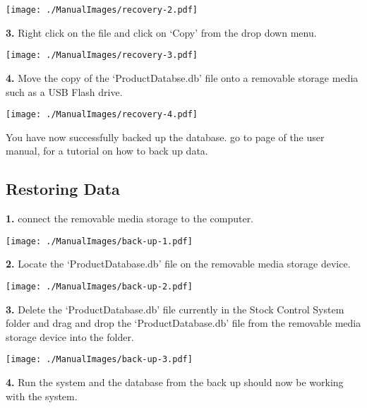 \texttt{[image: ./ManualImages/recovery-2.pdf]}

\textbf{3.} Right click on the file and click on `Copy' from the drop down menu.

\texttt{[image: ./ManualImages/recovery-3.pdf]}

\textbf{4.} Move the copy of the `ProductDatabse.db' file onto a removable storage media such as a USB Flash drive.

\texttt{[image: ./ManualImages/recovery-4.pdf]}

You have now successfully backed up the database. go to page \pageref{fig:Restoring Data}of the user manual, for a tutorial on how to back up data.

\pagebreak
\subsection{Restoring Data}
\label{fig:Restoring Data}

\textbf{1.} connect the removable media storage to the computer.

\texttt{[image: ./ManualImages/back-up-1.pdf]}

\textbf{2.} Locate the `ProductDatabase.db' file on the removable media storage device.

\texttt{[image: ./ManualImages/back-up-2.pdf]}

\pagebreak

\textbf{3.} Delete the `ProductDatabase.db' file currently in the Stock Control System folder and drag and drop the `ProductDatabase.db' file from the removable media storage device into the folder.

\texttt{[image: ./ManualImages/back-up-3.pdf]}

\textbf{4.} Run the system and the database from the back up should now be working with the system.

\stopcontents[chapters]